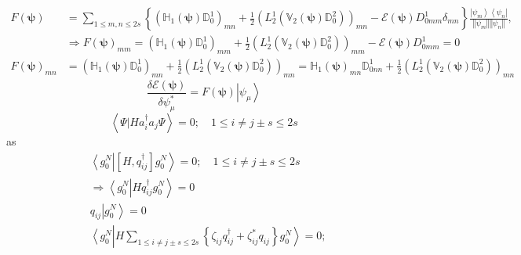 \documentclass[aps,preprint]{revtex4}%
\begin{document}
\begin{align}
F\left(  \mathbf{\psi}\right)   &  =\sum_{1\leq m,n\leq2s}\left\{  \left(
\mathbb{H}_{1}\left(  \mathbf{\psi}\right)  \mathbb{D}_{0}^{1}\right)
_{mn}+\frac{1}{2}\left(  L_{2}^{1}\left(  \mathbb{V}_{2}\left(  \mathbf{\psi
}\right)  \mathbb{D}_{0}^{2}\right)  \right)  _{mn}-\mathcal{E}\left(
\mathbf{\psi}\right)  D_{0mm}^{1}\delta_{mn}\right\}  \frac{\left\vert
\psi_{m}\right\rangle \left\langle \psi_{n}\right\vert }{\left\Vert \psi
_{m}\right\Vert \left\Vert \psi_{n}\right\Vert },\\
&  \Rightarrow F\left(  \mathbf{\psi}\right)  _{mm}=\left(  \mathbb{H}%
_{1}\left(  \mathbf{\psi}\right)  \mathbb{D}_{0}^{1}\right)  _{mm}+\frac{1}%
{2}\left(  L_{2}^{1}\left(  \mathbb{V}_{2}\left(  \mathbf{\psi}\right)
\mathbb{D}_{0}^{2}\right)  \right)  _{mm}-\mathcal{E}\left(  \mathbf{\psi
}\right)  D_{0mm}^{1}=0\\
F\left(  \mathbf{\psi}\right)  _{mn}  &  =\left(  \mathbb{H}_{1}\left(
\mathbf{\psi}\right)  \mathbb{D}_{0}^{1}\right)  _{mn}+\frac{1}{2}\left(
L_{2}^{1}\left(  \mathbb{V}_{2}\left(  \mathbf{\psi}\right)  \mathbb{D}%
_{0}^{2}\right)  \right)  _{mn}=\mathbb{H}_{1}\left(  \mathbf{\psi}\right)
_{mn}\mathbb{D}_{0nn}^{1}+\frac{1}{2}\left(  L_{2}^{1}\left(  \mathbb{V}%
_{2}\left(  \mathbf{\psi}\right)  \mathbb{D}_{0}^{2}\right)  \right)  _{mn}%
\end{align}%
\begin{equation}
\frac{\delta\mathcal{E}\left(  \mathbf{\psi}\right)  }{\delta\psi_{\mu}^{\ast
}}=F\left(  \mathbf{\psi}\right)  \left\vert \psi_{\mu}\right\rangle
\end{equation}%
\begin{equation}
\left\langle \left.  \Psi\right\vert Ha_{i}^{\dagger}a_{j}\Psi\right\rangle
=0;\quad1\leq i\neq j\pm s\leq2s
\end{equation}
as
\begin{align}
&  \left\langle g_{0}^{N}\right.  \left\vert \left[  H,q_{ij}^{\dagger
}\right]  g_{0}^{N}\right\rangle =0;\quad1\leq i\neq j\pm s\leq2s\\
&  \Rightarrow\left\langle g_{0}^{N}\right.  \left\vert Hq_{ij}^{\dagger}%
g_{0}^{N}\right\rangle =0\\
&  q_{ij}\left\vert g_{0}^{N}\right\rangle =0\\
&  \left\langle g_{0}^{N}\right.  \left\vert H\sum_{1\leq i\neq j\pm s\leq
2s}\left\{  \zeta_{ij}q_{ij}^{\dagger}+\zeta_{ij}^{\ast}q_{ij}\right\}
g_{0}^{N}\right\rangle =0;
\end{align}%
\end{document}

